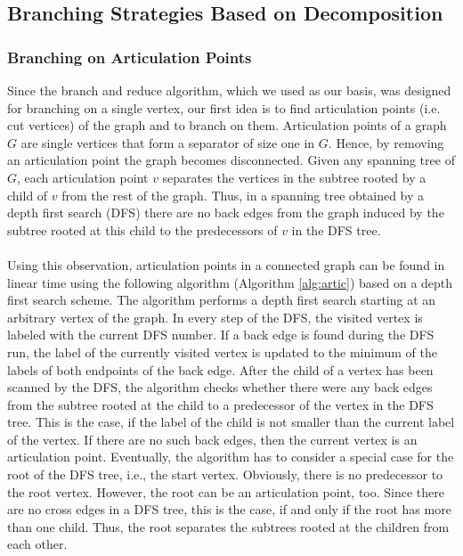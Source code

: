 \documentclass[12pt,a4paper,twoside]{scrartcl}
\numberwithin{equation}{section}
\begin{document}
\subsection{Branching Strategies Based on Decomposition} \label{decomp}
\subsubsection{Branching on Articulation Points}
Since the branch and reduce algorithm, which we used as our basis, was designed for branching on a single vertex, our first idea is to find articulation points (i.e. cut vertices) of the graph and to branch on them. Articulation points of a graph $G$ are single vertices that form a separator of size one in $G$. Hence, by removing an articulation point the graph becomes disconnected. Given any spanning tree of $G$, each articulation point $v$ separates the vertices in the subtree rooted by a child of $v$ from the rest of the graph. Thus, in a spanning tree obtained by a depth first search (DFS) there are no back edges from the graph induced by the subtree rooted at this child to the predecessors of $v$ in the DFS tree.

\paragraph{}
Using this observation, articulation points in a connected graph can be found in linear time using the following algorithm (Algorithm \ref{alg:artic}) based on a depth first search scheme. The algorithm performs a depth first search starting at an arbitrary vertex of the graph. In every step of the DFS, the visited vertex is labeled with the current DFS number. If a back edge is found during the DFS run, the label of the currently visited vertex is updated to the minimum of the labels of both endpoints of the back edge. After the child of a vertex has been scanned by the DFS, the algorithm checks whether there were any back edges from the subtree rooted at the child to a predecessor of the vertex in the DFS tree. This is the case, if the label of the child is not smaller than the current label of the vertex. If there are no such back edges, then the current vertex is an articulation point. Eventually, the algorithm has to consider a special case for the root of the DFS tree, i.e., the start vertex. Obviously, there is no predecessor to the root vertex. However, the root can be an articulation point, too. Since there are no cross edges in a DFS tree, this is the case, if and only if the root has more than one child. Thus, the root separates the subtrees rooted at the children from each other.
\end{document}
